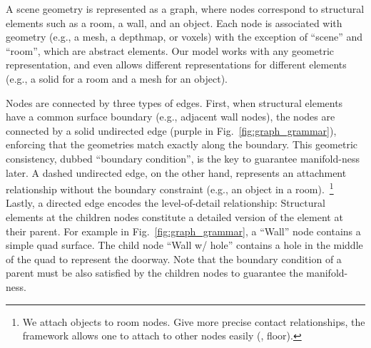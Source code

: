 A scene geometry is represented as a graph, where nodes correspond to
structural elements such as a room, a wall, and an object. Each node is
associated with geometry (e.g., a mesh, a depthmap, or voxels)
with the exception of ``scene'' and ``room'', which are abstract
elements. Our model works with any geometric representation, and even
allows different representations for different elements (e.g., a solid
for a room and a mesh for an object).

Nodes are connected by three types of edges.
First, when structural elements have a common surface boundary (e.g.,
adjacent wall nodes), the nodes are connected by a solid undirected edge
(purple in Fig.~\ref{fig:graph_grammar}), enforcing that the geometries
match exactly along the boundary. This geometric consistency, dubbed
``boundary condition'', is the key to guarantee manifold-ness later. A
dashed undirected edge, on the other hand, represents an attachment
relationship without the boundary constraint (e.g., an object in a
room).~\footnote{We attach objects to room nodes. Give more precise
contact relationships, the framework allows one to attach to other nodes
easily (\eg, floor).}  Lastly, a directed edge encodes the
level-of-detail relationship: Structural elements at the children nodes
constitute a detailed version of the element at their parent. For
example in Fig.~\ref{fig:graph_grammar}, a ``Wall'' node contains a
simple quad surface. The child node ``Wall w/ hole''
contains a hole in the middle of the quad to represent the doorway.
Note that the boundary condition of a parent must be also satisfied by
the children nodes to guarantee the manifold-ness.

%


